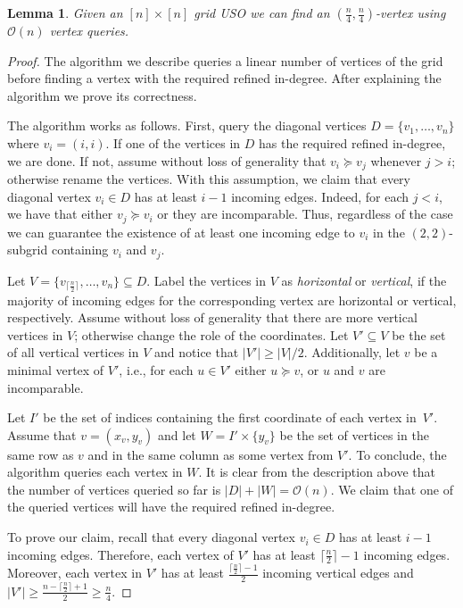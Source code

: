 \documentclass[a4paper,10pt]{article}
\newtheorem{lemma}{Lemma}
\newcommand{\indegree}{refined in-degree\xspace}
\begin{document}
\begin{lemma}
\label{lem:seed_lemma_for_square_matrices}
 Given an $[n]\times [n]$ grid USO we can find an $(\frac{n}{4}, \frac{n}{4})$-vertex using $\mathcal{O}(n)$ vertex queries.
\end{lemma}

\begin{proof}
The algorithm we describe queries a linear number of vertices of the grid before finding a vertex with the required \indegree. 
After explaining the algorithm we prove its correctness.
  
The algorithm works as follows. First, query the diagonal vertices $D = \{v_1,\ldots, v_n\}$ where $v_i = (i,i)$. If one of the vertices in $D$ has the required \indegree, we are done. If not, assume without loss of generality that $v_i \succeq v_j$ whenever $j > i$; otherwise rename the vertices. 
With this assumption, we claim that every diagonal vertex $v_i \in D$ has at least $i - 1$ incoming edges. Indeed, for each $j < i$, we have that either $v_j \succeq v_i$ or they are incomparable. Thus, regardless of the case we can guarantee the existence of at least one incoming edge to $v_i$ in the $(2, 2)$-subgrid containing $v_i$ and $v_j$. 

Let $V = \{v_{\lceil \frac{n}{2} \rceil},\ldots,v_n\} \subseteq D$.
Label the vertices in $V$ as \emph{horizontal}  or \emph{vertical}, if the majority of incoming edges for the corresponding vertex are horizontal  or vertical, respectively. 
Assume without loss of generality that there are more vertical vertices in $V$; otherwise change the role of the coordinates. 
Let $V' \subseteq V$ be the set of all vertical vertices in $V$ and notice that $|V'| \geq |V|/2$.
 Additionally, let $v$ be a minimal vertex of $V'$, i.e., for each $u\in V'$ either $u\succeq v$, or $u$ and $v$ are incomparable. 

Let $I'$ be the set of indices containing the first coordinate of each vertex in~$V'$.
Assume that $v = (x_v, y_v)$ and let $W = I'\times \{y_v\}$ be the set of vertices in the same row as $v$ and in the same column as some vertex from $V'$.
To conclude, the algorithm queries each vertex in $W$.
It is clear from the description above that the number of vertices queried so far is $|D| + |W| = \mathcal{O}(n)$. 
We claim that one of the queried vertices will have the required \indegree.

To prove our claim, recall that every diagonal vertex $v_i \in D$ has at least $i - 1$ incoming edges.  
Therefore, each vertex of $V'$ has at least $\lceil \frac{n}{2} \rceil - 1$ incoming edges. 
Moreover, each vertex in $V'$ has at least $\frac{\lceil \frac{n}{2}\rceil-1}{2}$ incoming vertical edges and $|V'| \geq \frac{n-\lceil \frac{n}{2}\rceil + 1}{2} \geq \frac{n}{4}$. 


\end{proof}
\end{document}
